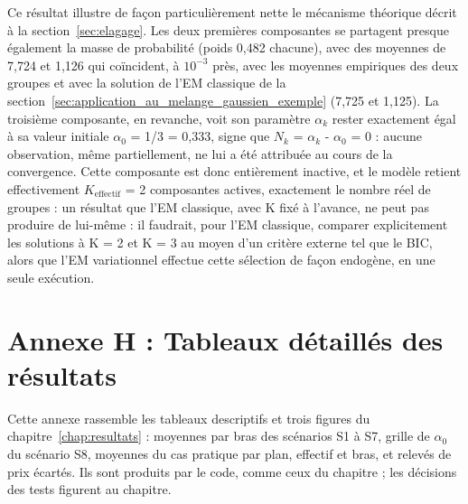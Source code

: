 Ce résultat illustre de façon particulièrement nette le mécanisme théorique décrit à la section~\ref{sec:elagage}. Les deux premières composantes se partagent presque également la masse de probabilité (poids 0,482 chacune), avec des moyennes de 7,724 et 1,126 qui coïncident, à $10^{-3}$ près, avec les moyennes empiriques des deux groupes et avec la solution de l'EM classique de la section~\ref{sec:application_au_melange_gaussien_exemple} (7,725 et 1,125). La troisième composante, en revanche, voit son paramètre $\alpha _{k}$ rester exactement égal à sa valeur initiale $\alpha _{0}$ = 1/3 = 0,333, signe que $N_{k}$ = $\alpha _{k}$ - $\alpha _{0}$ = 0 : aucune observation, même partiellement, ne lui a été attribuée au cours de la convergence. Cette composante est donc entièrement inactive, et le modèle retient effectivement $K_{\text{effectif}}$ = 2 composantes actives, exactement le nombre réel de groupes : un résultat que l'EM classique, avec K fixé à l'avance, ne peut pas produire de lui-même : il faudrait, pour l'EM classique, comparer explicitement les solutions à K = 2 et K = 3 au moyen d'un critère externe tel que le BIC, alors que l'EM variationnel effectue cette sélection de façon endogène, en une seule exécution.

\section*{Annexe H : Tableaux détaillés des résultats}
Cette annexe rassemble les tableaux descriptifs et trois figures du chapitre~\ref{chap:resultats} : moyennes par bras des scénarios S1 à S7, grille de $\alpha_0$ du scénario S8, moyennes du cas pratique par plan, effectif et bras, et relevés de prix écartés. Ils sont produits par le code, comme ceux du chapitre ; les décisions des tests figurent au chapitre.
\setcounter{table}{0}\renewcommand{\thetable}{H.\arabic{table}}\renewcommand{\theHtable}{H.\arabic{table}}

